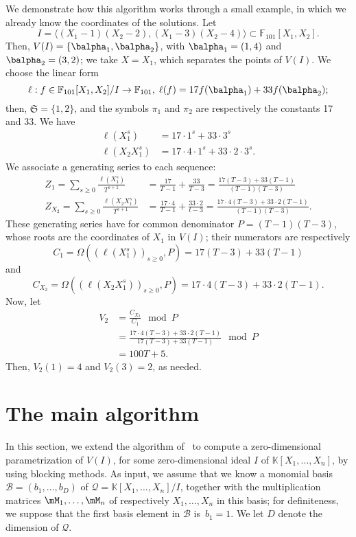 \documentclass[12pt]{article}
\newcommand{\basis}{\mathscr{B}}
\newcommand{\minpoly}{P}
\newcommand{\lf}{X}
\newcommand{\residueI}{\mathscr{Q}}
\def\F {\ensuremath{\mathbb{F}}}
\def\K{\mathbb{K}}
\def\K {\ensuremath{\mathbb{K}}}
\begin{document}
We demonstrate how this algorithm works through a small example, in 
which we already know the coordinates of the solutions. Let 
$$I = \langle (X_1-1)(X_2-2),(X_1-3)(X_2-4)\rangle \subset
\F_{101}[X_1,X_2].$$ Then, $V(I) = \{\balpha_1,\balpha_2\}$,
with $\balpha_1= (1,4)$ and $\balpha_2=(3,2)$; we take
$\lf=X_1$, which separates the points of $V(I)$.  We choose the linear form
$$\ell: f \in \F_{101}[X_1,X_2]/I \to \F_{101},\;\ell(f) = 17 f(\balpha_1) + 33 f(\balpha_2);$$
then, $\mathfrak{S}=\{1,2\}$, and the symbols $\pi_1$ and $\pi_2$ 
are respectively the constants 17 and 33. We have
\begin{align*}
\ell(X_1^s) &= 17 \cdot 1^s + 33 \cdot 3^s\\
\ell(X_2X_1^s) &= 17 \cdot 4 \cdot 1^s + 33 \cdot 2 \cdot 3^s.
\end{align*} 
We associate a generating series to each sequence:
\begin{align*}
Z_1 = \sum_{s \ge 0} \frac{\ell(X^s_1)}{T^{s+1}}
&= \frac{17}{T-1} + \frac{33}{T-3}
= \frac{17(T-3)+33(T-1)}{(T-1)(T-3)} \\
Z_{X_2} = \sum_{s\ge0} \frac{\ell(X_2X_1^s)}{T^{s+1} }
&= \frac{17\cdot 4}{T-1} + \frac{33 \cdot 2}{t-3}
= \frac{17\cdot 4 (T-3) + 33\cdot 2(T-1)}{(T-1)(T-3)}.
\end{align*}
These generating series have for common denominator $\minpoly = (T-1)(T-3)$,
whose roots are the coordinates of $X_1$ in $V(I)$;
their numerators are respectively
$$C_{1} = \Omega((\ell(X^s_1))_{s\ge 0},\minpoly) = 17 (T-3) + 33(T-1)$$
and
$$C_{X_2} = \Omega((\ell(X_2X^s_1))_{s\ge 0},\minpoly) = 17\cdot 4 (T-3) + 33\cdot 2(T-1).$$
Now, let
\begin{align*}
V_2 
&=\frac{C_{X_2}}{C_1} \mod \minpoly\\
&=\frac{17\cdot 4 (T-3) + 33\cdot 2(T-1)}{17(T-3)+33(T-1)} \mod \minpoly\\
&=100 T +5.
\end{align*}
Then, $ V_2(1) = 4$ and $V_2(3) = 2$, as needed.


\section{The main algorithm}\label{sec:main}

In this section, we extend the algorithm of~\cite{BoSaSc03} to compute
a zero-dimensional parametrization of $V(I)$, for some
zero-dimensional ideal $I$ of $\K[X_1,\dots,X_n]$, by using blocking
methods. As input, we assume that we know a monomial basis
$\basis=(b_1,\dots,b_D)$ of $\residueI=\K[X_1,\dots,X_n]/I$, together
with the multiplication matrices $\mM_1,\dots,\mM_n$ of respectively
$X_1,\dots,X_n$ in this basis; for definiteness, we suppose that the
first basis element in $\basis$ is~$b_1=1$. We let $D$ denote the
dimension of $\residueI$.
\end{document}
